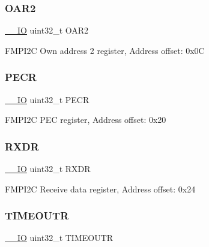 \subsubsection{\texorpdfstring{O\+A\+R2}{OAR2}}
{\footnotesize\ttfamily \mbox{\hyperlink{core__sc300_8h_aec43007d9998a0a0e01faede4133d6be}{\+\_\+\+\_\+\+IO}} uint32\+\_\+t O\+A\+R2}

F\+M\+P\+I2C Own address 2 register, Address offset\+: 0x0C \mbox{\label{struct_f_m_p_i2_c___type_def_af427631ab4515bb1f16bf5869682c18b}} 
\subsubsection{\texorpdfstring{P\+E\+CR}{PECR}}
{\footnotesize\ttfamily \mbox{\hyperlink{core__sc300_8h_aec43007d9998a0a0e01faede4133d6be}{\+\_\+\+\_\+\+IO}} uint32\+\_\+t P\+E\+CR}

F\+M\+P\+I2C P\+EC register, Address offset\+: 0x20 \mbox{\label{struct_f_m_p_i2_c___type_def_a9bf29a9104cb5569823ab892174f9c8c}} 
\subsubsection{\texorpdfstring{R\+X\+DR}{RXDR}}
{\footnotesize\ttfamily \mbox{\hyperlink{core__sc300_8h_aec43007d9998a0a0e01faede4133d6be}{\+\_\+\+\_\+\+IO}} uint32\+\_\+t R\+X\+DR}

F\+M\+P\+I2C Receive data register, Address offset\+: 0x24 \mbox{\label{struct_f_m_p_i2_c___type_def_a95187d83f061ebbddd8668d0db3fbaa5}} 
\subsubsection{\texorpdfstring{T\+I\+M\+E\+O\+U\+TR}{TIMEOUTR}}
{\footnotesize\ttfamily \mbox{\hyperlink{core__sc300_8h_aec43007d9998a0a0e01faede4133d6be}{\+\_\+\+\_\+\+IO}} uint32\+\_\+t T\+I\+M\+E\+O\+U\+TR}

